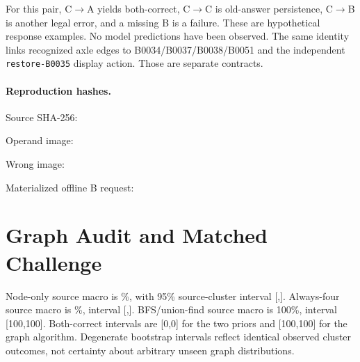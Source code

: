\documentclass[10pt,letterpaper]{article}
\begin{document}
For this pair, C$\rightarrow$A yields both-correct, C$\rightarrow$C
is old-answer persistence, C$\rightarrow$B is another legal error,
and a missing B is a failure. These are hypothetical response examples.
No model predictions have been observed. The same identity links
recognized axle edges to B0034/B0037/B0038/B0051 and the independent
\texttt{restore-B0035} display action. Those are separate contracts.

\paragraph{Reproduction hashes.}
Source SHA-256:\par
{}
\par Operand image:\par
{}
\par Wrong image:\par
{}
\par Materialized offline B request:\par
{}

\clearpage
\section{Graph Audit and Matched Challenge}
\begin{table}[h]
\centering\small
\caption{Algorithmic baselines on all natural deletion items and
the original/intervened pairs, with identical denominators.}

\end{table}
Node-only source macro is \EvNodeMacro\%, with 95\% source-cluster
interval [\EvNodeLo,\EvNodeHi]. Always-four source macro is
\EvFixedMacro\%, interval [\EvFixedLo,\EvFixedHi]. BFS/union-find source macro is
100\%, interval [100,100]. Both-correct intervals are [0,0] for
the two priors and [100,100] for the graph algorithm. Degenerate
bootstrap intervals reflect identical observed cluster outcomes,
not certainty about arbitrary unseen graph distributions.

\begin{table}[h]
\centering\small
\caption{Per-source census of node-only results. No source or question
is removed because of its score.}

\end{table}
\begin{table}[h]
\centering\small
\caption{Every natural node-only failure. These ten items across nine
sources are the complete positive-deficit stratum.}

\end{table}
\end{document}

